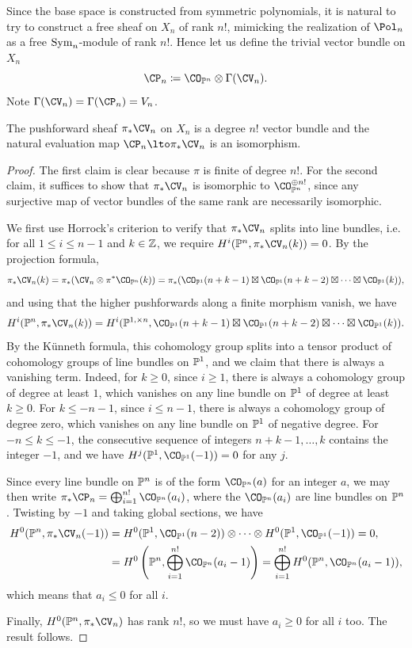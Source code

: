 \documentclass[11pt,reqno]{amsart}
\begin{document}
Since the base space is constructed from symmetric polynomials, it is natural to try to construct a free sheaf on $X_n$ of rank $n!$, mimicking the realization of $\Pol_n$ as a free $\operatorname{Sym}_n$-module of rank $n!$. Hence let us define the trivial vector bundle on $X_n$
\[\CP_n\coloneqq \CO_{\BP^n}\otimes \Gamma(\CV_n).\] 
Note $\Gamma(\CV_n)=\Gamma(\CP_n)=V_n$.
\begin{proposition}
    The pushforward sheaf $\pi_*\CV_n$ on $X_n$ is a degree $n!$ vector bundle and the natural evaluation map $\CP_n\lto \pi_*\CV_n$ is an isomorphism.
\end{proposition}
\begin{proof}
    The first claim is clear because $\pi$ is finite of degree $n!$. For the second claim, it suffices to show that $\pi_* \CV_n$ is isomorphic to $\CO_{\BP^n}^{\oplus n!}$, since any surjective map of vector bundles of the same rank are necessarily isomorphic.

    We first use Horrock's criterion to verify that $\pi_* \CV_n$ splits into line bundles, i.e. for all $1\le i \le n-1$ and $k\in \mathbb Z$, we require $H^i(\BP^n,\pi_*\CV_n(k))=0$. By the projection formula, \[\pi_*\CV_n(k) = \pi_*(\CV_n \otimes \pi^*\CO_{\BP^n}(k)) = \pi_*(\CO_{\BP^1}(n+k-1)\boxtimes\CO_{\BP^1}(n+k-2)\boxtimes\cdots\boxtimes\CO_{\BP^1}(k)),\] and using that the higher pushforwards along a finite morphism vanish, we have \[H^i(\BP^n,\pi_*\CV_n(k)) = H^i(\BP^{1,\times n}, \CO_{\BP^1}(n+k-1)\boxtimes\CO_{\BP^1}(n+k-2)\boxtimes\cdots\boxtimes\CO_{\BP^1}(k)).\] By the K\"unneth formula, this cohomology group splits into a tensor product of cohomology groups of line bundles on $\mathbb P^1$, and we claim that there is always a vanishing term. Indeed, for $k\ge 0$, since $i\ge 1$, there is always a cohomology group of degree at least $1$, which vanishes on any line bundle on $\mathbb P^1$ of degree at least $k\ge 0$. For $k \le -n-1$, since $i \le n-1$, there is always a cohomology group of degree zero, which vanishes on any line bundle on $\mathbb P^1$ of negative degree. For $-n \le k \le -1$, the consecutive sequence of integers $n+k-1, \ldots, k$ contains the integer $-1$, and we have $H^j(\BP^1, \CO_{\BP^1}(-1))=0$ for any $j$. 
    
    Since every line bundle on $\mathbb P^n$ is of the form $\CO_{\BP^n}(a)$ for an integer $a$, we may then write $\pi_*\CP_n = \bigoplus_{i=1}^{n!} \CO_{\BP^n}(a_i)$, where the $\CO_{\BP^n}(a_i)$ are line bundles on $\mathbb P^n$. Twisting by $-1$ and taking global sections, we have 
    \begin{align*}
        H^0(\BP^n,\pi_*\CV_n(-1))&=H^0(\BP^1,\CO_{\BP^1}(n-2))\otimes \cdots \otimes H^0(\BP^1,\CO_{\BP^1}(-1))=0,\\
        &=H^0\left(\BP^n,\bigoplus_{i=1}^{n!}\CO_{\BP^n}(a_i-1)\right)=\bigoplus_{i=1}^{n!}H^0(\BP^n,\CO_{\BP^n}(a_i-1)),
    \end{align*}
    which means that $a_i\le 0$ for all $i$. 

    Finally, $H^0(\BP^n,\pi_*\CV_n)$ has rank $n!$, so we must have $a_i\ge 0$ for all $i$ too. The result follows.
\end{proof}
\end{document}
